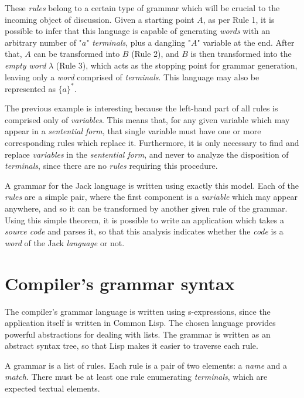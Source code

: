 \documentclass[a4paper,11pt,oneside]{article}
\begin{document}
These \emph{rules} belong to a certain type of grammar which will be crucial
to the incoming object of discussion. Given a starting point \(A\), as
per Rule 1, it is possible to infer that this language is capable of
generating \emph{words} with an arbitrary number of "\(a\)" \emph{terminals}, plus a
dangling "\(A\)" variable at the end. After that, \(A\) can be transformed
into \(B\) (Rule 2), and \(B\) is then transformed into the \emph{empty word}
\(\lambda\) (Rule 3), which acts as the stopping point for grammar
generation, leaving only a \emph{word} comprised of \emph{terminals}. This language
may also be represented as \(\{a\}^{*}\).

The previous example is interesting because the left-hand part of all
rules is comprised only of \emph{variables}. This means that, for any given
variable which may appear in a \emph{sentential form}, that single variable
must have one or more corresponding rules which replace
it. Furthermore, it is only necessary to find and replace \emph{variables} in
the \emph{sentential form}, and never to analyze the disposition of
\emph{terminals}, since there are no \emph{rules} requiring this procedure.

A grammar for the Jack language \cite{nand2tetris} is written using
exactly this model. Each of the \emph{rules} are a simple pair, where the
first component is a \emph{variable} which may appear anywhere, and so it can
be transformed by another given rule of the grammar. Using this simple
theorem, it is possible to write an application which takes a \emph{source
code} and parses it, so that this analysis indicates whether the \emph{code}
is a \emph{word} of the Jack \emph{language} or not.

\section{Compiler's grammar syntax}
\label{sec:org8097fbd}

The compiler's grammar language is written using s-expressions, since
the application itself is written in Common Lisp. The chosen language
provides powerful abstractions for dealing with lists. The grammar is
written as an abstract syntax tree, so that Lisp makes it easier to
traverse each rule.

A grammar is a list of rules. Each rule is a pair of two elements: a
\emph{name} and a \emph{match}. There must be at least one rule enumerating
\emph{terminals}, which are expected textual elements.
\end{document}
